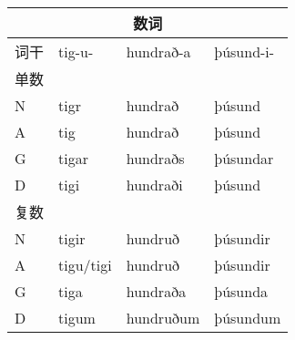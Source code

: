 \begin{longtable}{llll}
    \toprule
    \multicolumn{4}{c}{数词}              \\
    \midrule
    \endhead
    \bottomrule
    \endfoot
    词干 & tig-u- & hundrað-a & þúsund-i- \\
    单数 &        &           &           \\
    N  & tigr   & hundrað   & þúsund    \\
    A  & tig    & hundrað   & þúsund    \\
    G  & tigar  & hundraðs  & þúsundar  \\
    D  & tigi   & hundraði  & þúsund    \\
    复数 &        &           &           \\
    N  & tigir  & hundruð   & þúsundir  \\
    A  & tigu/tigi   & hundruð   & þúsundir  \\
    G  & tiga   & hundraða  & þúsunda   \\
    D  & tigum  & hundruðum & þúsundum  \\
\end{longtable}
